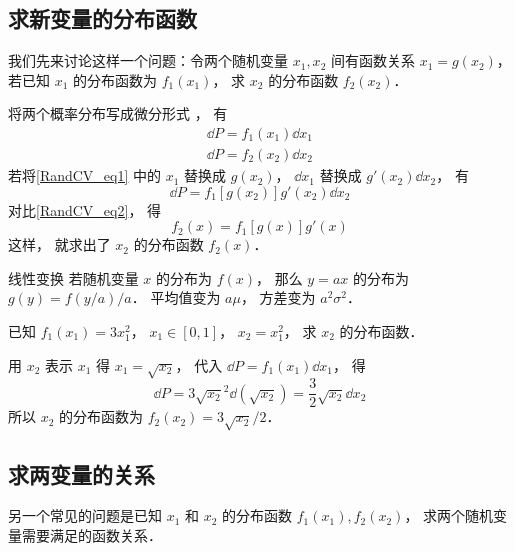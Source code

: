 

\subsection{求新变量的分布函数}

我们先来讨论这样一个问题：令两个随机变量 $x_1, x_2$ 间有函数关系 $x_1 = g(x_2)$， 若已知 $x_1$ 的分布函数为 $f_1(x_1)$， 求 $x_2$ 的分布函数 $f_2(x_2)$．

将两个概率分布写成微分形式%
， 有
\begin{gather}
\dd{P} = f_1(x_1) \dd{x_1}\label{RandCV_eq1}\\
\dd{P} = f_2(x_2) \dd{x_2} \label{RandCV_eq2}
\end{gather}
若将\autoref{RandCV_eq1} 中的 $x_1$ 替换成 $g(x_2)$， $\dd{x_1}$ 替换成 $g'(x_2)\dd{x_2}$， 有
\begin{equation}
\dd{P} = f_1[g(x_2)] g'(x_2) \dd{x_2}
\end{equation}
对比\autoref{RandCV_eq2}， 得
\begin{equation}
f_2(x) = f_1[g(x)] g'(x)
\end{equation}
这样， 就求出了 $x_2$ 的分布函数 $f_2(x)$．

\begin{example}{线性变换}\label{RandCV_ex1}
若随机变量 $x$ 的分布为 $f(x)$， 那么 $y = ax$ 的分布为 $g(y) = f(y/a)/a$． 平均值变为 $a\mu$， 方差变为 $a^2\sigma^2$．
\end{example}

\begin{example}{}
已知 $f_1(x_1) = 3x_1^2$， $x_1 \in [0, 1]$， $x_2 = x_1^2$， 求 $x_2$ 的分布函数．

用 $x_2$ 表示 $x_1$ 得 $x_1 = \sqrt{x_2}$， 代入 $\dd{P} = f_1(x_1)\dd{x_1}$， 得
\begin{equation}
\dd{P} = 3\sqrt{x_2}^2 \dd(\sqrt{x_2}) = \frac32 \sqrt{x_2} \dd{x_2}
\end{equation}
所以 $x_2$ 的分布函数为 $f_2(x_2) = 3\sqrt{x_2}/2$．
\end{example}

\subsection{求两变量的关系}

另一个常见的问题是已知 $x_1$ 和 $x_2$ 的分布函数 $f_1(x_1), f_2(x_2)$， 求两个随机变量需要满足的函数关系．

